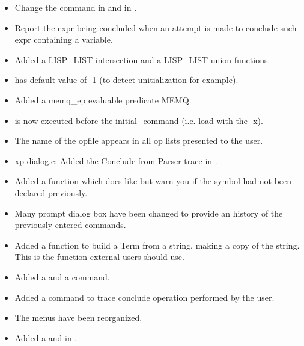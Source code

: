 \begin{itemize}
\item Change the command  in 
and  in .

\item Report the expr being concluded when an attempt is made to conclude such
expr containing a variable.

\item Added a LISP\_LIST intersection and a LISP\_LIST union functions. 

\item {} has default value of -1 (to detect
unitialization for example).

\item Added a memq\_ep evaluable predicate MEMQ.

\item {} is now executed before the
initial\_command (i.e. load with the -x).

\item The name of the opfile appears in all op lists
presented to the user.

\item xp-dialog.c: Added the Conclude from Parser trace in \XPK{}.

\item Added a  function which does like 
but warn you if the symbol had not been declared previously.

\item Many prompt dialog box have been changed to provide an history of the
previously entered commands.

\item Added a  function to build a Term from
a string, making a copy of the string. This is the function external users
should use.

\item Added a  and a 
command. 

\item Added a  command to trace conclude operation
performed by the user.

\item The \XPK{} menus have been reorganized.

\item Added a  and  in \XPK{}.


\end{itemize}

